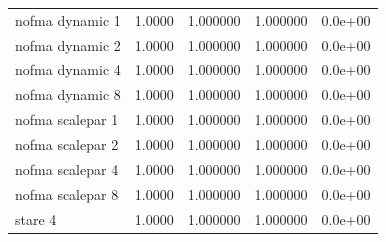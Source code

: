 \begin{tabular}{lrrrr}
nofma dynamic 1 & 1.0000 & 1.000000 & 1.000000 & 0.0e+00 \\
nofma dynamic 2 & 1.0000 & 1.000000 & 1.000000 & 0.0e+00 \\
nofma dynamic 4 & 1.0000 & 1.000000 & 1.000000 & 0.0e+00 \\
nofma dynamic 8 & 1.0000 & 1.000000 & 1.000000 & 0.0e+00 \\
nofma scalepar 1 & 1.0000 & 1.000000 & 1.000000 & 0.0e+00 \\
nofma scalepar 2 & 1.0000 & 1.000000 & 1.000000 & 0.0e+00 \\
nofma scalepar 4 & 1.0000 & 1.000000 & 1.000000 & 0.0e+00 \\
nofma scalepar 8 & 1.0000 & 1.000000 & 1.000000 & 0.0e+00 \\
stare 4 & 1.0000 & 1.000000 & 1.000000 & 0.0e+00 \\
\bottomrule
\end{tabular}
